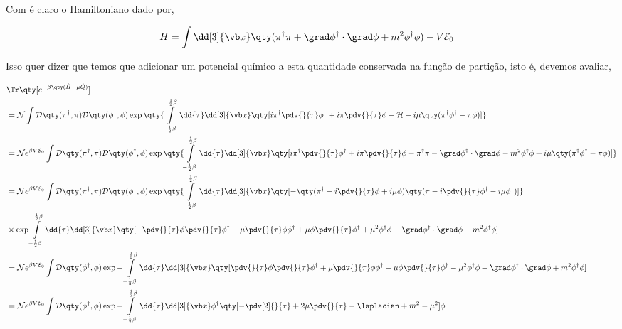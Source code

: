 \documentclass[twoside]{amsart}
\numberwithin{equation}{section}
\newcommand{\Dd}[1]{\mathcal D #1}
\begin{document}
\begin{refsection}
Com é claro o Hamiltoniano dado por,

\begin{align}
    H&=\int\dd[3]{\vb x}\qty(\pi^\dagger\pi+\grad\phi^\dagger\cdot\grad\phi+m^2\phi^\dagger\phi)-V\mathcal E_0
\end{align}

Isso quer dizer que temos que adicionar um potencial químico a esta quantidade conservada na função de partição, isto é, devemos avaliar,

\begin{align}
    &\Tr\qty[e^{-\beta\qty(\hat H-\mu \hat Q)}]\\
    &=\mathcal N\int\Dd\qty(\pi^\dagger,\pi)\Dd\qty(\phi^\dagger,\phi)\exp\qty{\int\limits_{-\frac12\beta}^{\frac12\beta}\dd{\tau}\dd[3]{\vb x}\qty[i\pi^\dagger\pdv{}{\tau}\phi^\dagger+i\pi\pdv{}{\tau}\phi-\mathcal H+i\mu\qty(\pi^\dagger\phi^\dagger-\pi\phi)]}\\
    &=\mathcal Ne^{\beta V\mathcal E_0}\int\Dd\qty(\pi^\dagger,\pi)\Dd\qty(\phi^\dagger,\phi)\exp\qty{\int\limits_{-\frac12\beta}^{\frac12\beta}\dd{\tau}\dd[3]{\vb x}\qty[i\pi^\dagger\pdv{}{\tau}\phi^\dagger+i\pi\pdv{}{\tau}\phi-\pi^\dagger\pi-\grad\phi^\dagger\cdot\grad\phi-m^2\phi^\dagger\phi+i\mu\qty(\pi^\dagger\phi^\dagger-\pi\phi)]}\\
    &=\mathcal Ne^{\beta V\mathcal E_0}\int\Dd\qty(\pi^\dagger,\pi)\Dd\qty(\phi^\dagger,\phi)\exp\qty{\int\limits_{-\frac12\beta}^{\frac12\beta}\dd{\tau}\dd[3]{\vb x}\qty[-\qty(\pi^\dagger-i\pdv{}{\tau}\phi+i\mu\phi)\qty(\pi-i\pdv{}{\tau}\phi^\dagger-i\mu\phi^\dagger)]}\\
    &\times\exp{\int\limits_{-\frac12\beta}^{\frac12\beta}\dd{\tau}\dd[3]{\vb x}\qty[-\pdv{}{\tau}\phi\pdv{}{\tau}\phi^\dagger-\mu\pdv{}{\tau}\phi\phi^\dagger+\mu\phi\pdv{}{\tau}\phi^\dagger+\mu^2\phi^\dagger\phi-\grad\phi^\dagger\cdot\grad\phi-m^2\phi^\dagger\phi]}\nonumber\\
    &=\mathcal Ne^{\beta V\mathcal E_0}\int\Dd\qty(\phi^\dagger,\phi)\exp{-\int\limits_{-\frac12\beta}^{\frac12\beta}\dd{\tau}\dd[3]{\vb x}\qty[\pdv{}{\tau}\phi\pdv{}{\tau}\phi^\dagger+\mu\pdv{}{\tau}\phi\phi^\dagger-\mu\phi\pdv{}{\tau}\phi^\dagger-\mu^2\phi^\dagger\phi+\grad\phi^\dagger\cdot\grad\phi+m^2\phi^\dagger\phi]}\\
    &=\mathcal Ne^{\beta V\mathcal E_0}\int\Dd\qty(\phi^\dagger,\phi)\exp{-\int\limits_{-\frac12\beta}^{\frac12\beta}\dd{\tau}\dd[3]{\vb x}\phi^\dagger\qty[-\pdv[2]{}{\tau}+2\mu\pdv{}{\tau}-\laplacian+m^2-\mu^2]\phi}
\end{align}


\end{refsection}
\end{document}
